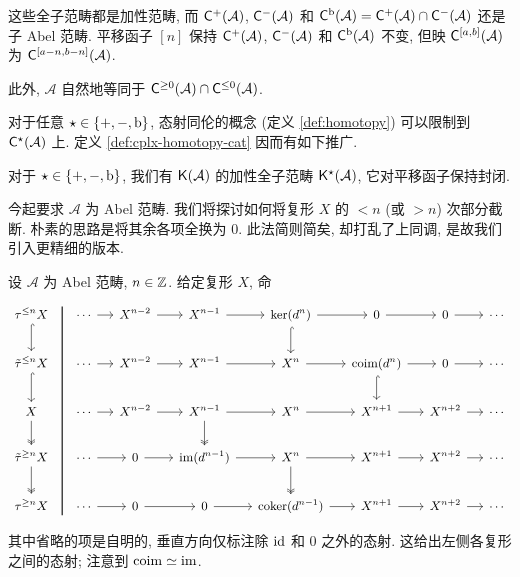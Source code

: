 这些全子范畴都是加性范畴, 而 $\mathsf{C}^+(\mathcal{A})$, $\mathsf{C}^-(\mathcal{A})$ 和 $\mathsf{C}^{\mathrm{b}}(\mathcal{A}) = \mathsf{C}^+(\mathcal{A}) \cap \mathsf{C}^-(\mathcal{A})$ 还是子 Abel 范畴. 平移函子 $[n]$ 保持 $\mathsf{C}^+(\mathcal{A})$, $\mathsf{C}^-(\mathcal{A})$ 和 $\mathsf{C}^{\mathrm{b}}(\mathcal{A})$ 不变, 但映 $\mathsf{C}^{[a,b]}(\mathcal{A})$ 为 $\mathsf{C}^{[a-n, b-n]}(\mathcal{A})$.

此外, $\mathcal{A}$ 自然地等同于 $\mathsf{C}^{\geq 0}(\mathcal{A}) \cap \mathsf{C}^{\leq 0}(\mathcal{A})$.

对于任意 $\star \in \{+, -, \mathrm{b}\}$, 态射同伦的概念 (定义 \ref{def:homotopy}) 可以限制到 $\mathsf{C}^{\star}(\mathcal{A})$ 上. 定义 \ref{def:cplx-homotopy-cat} 因而有如下推广.

\begin{definition}\label{def:cplx-homotopy-cat-variant}
	对于 $\star \in \{+, -, \mathrm{b}\}$, 我们有 $\mathsf{K}(\mathcal{A})$ 的加性全子范畴 $\mathsf{K}^\star(\mathcal{A})$, 它对平移函子保持封闭.
\end{definition}

今起要求 $\mathcal{A}$ 为 Abel 范畴. 我们将探讨如何将复形 $X$ 的 $< n$ (或 $> n$) 次部分截断. 朴素的思路是将其余各项全换为 $0$. 此法简则简矣, 却打乱了上同调, 是故我们引入更精细的版本.

\begin{definition}[截断函子]\label{def:truncation-cplx}
	设 $\mathcal{A}$ 为 Abel 范畴, $n \in \mathbb{Z}$. 给定复形 $X$, 命
	\[\begin{tikzcd}
		[column sep=small, every cell/.append style = {font = \small}]
		\tau^{\leq n} X \arrow[phantom, r, "" {name=A, yshift=2ex}] \arrow[hookrightarrow, d] & \cdots \arrow[r] & X^{n-2} \arrow[r] & X^{n-1} \arrow[r] & \Ker(d^n) \arrow[r] \arrow[hookrightarrow, d] & 0 \arrow[r] & 0 \arrow[r] & \cdots \\
		\tilde{\tau}^{\leq n} X \arrow[hookrightarrow, d] & \cdots \arrow[r] & X^{n-2} \arrow[r] & X^{n-1} \arrow[r] & X^n \arrow[r] & \Coim(d^n) \arrow[r] \arrow[hookrightarrow, d] & 0 \arrow[r] & \cdots \\
		X \arrow[twoheadrightarrow, d] & \cdots \arrow[r] & X^{n-2} \arrow[r] & X^{n-1} \arrow[r] \arrow[twoheadrightarrow, d] & X^n \arrow[r] & X^{n+1} \arrow[r] & X^{n+2} \arrow[r] & \cdots \\
		\tilde{\tau}^{\geq n} X \arrow[twoheadrightarrow, d] & \cdots \arrow[r] & 0 \arrow[r] & \Image(d^{n-1}) \arrow[r] & X^n \arrow[r] \arrow[twoheadrightarrow, d] & X^{n+1} \arrow[r] & X^{n+2} \arrow[r] & \cdots \\
		\tau^{\geq n} X \arrow[phantom, r, "" {name=B, yshift=-2ex}] & \cdots \arrow[r] & 0 \arrow[r] & 0 \arrow[r] & \Coker(d^{n-1}) \arrow[r] & X^{n+1} \arrow[r] & X^{n+2} \arrow[r] & \cdots
		\arrow[dash, thick, from=A, to=B]
	\end{tikzcd}\]
	其中省略的项是自明的, 垂直方向仅标注除 $\mathrm{id}$ 和 $0$ 之外的态射. 这给出左侧各复形之间的态射; 注意到 $\operatorname{coim} \simeq \operatorname{im}$.
\end{definition}

